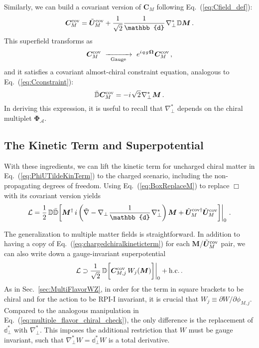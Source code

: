 \documentclass[12pt,document,nofootinbib,superscriptaddress,onecolumn,preprintnumbers,balancelastpage]{article}
\newcommand{\s}{\hspace{0.8pt}}
\newcommand{\PP}{\mathbb{d}}
\newcommand{\gauge}{\,\,\xrightarrow[\hspace{5pt}\text{Gauge}\hspace{5pt}]{}\,\,}
\DeclareRobustCommand{\Sec}[1]{Sec.~\ref{#1}}
\DeclareRobustCommand{\Eq}[1]{Eq.~(\ref{#1})}
\newcommand{\bM}{ \boldsymbol M}
\newcommand{\bPhiA}{ \boldsymbol{\Phi}_\alc}
\newcommand{\bC}{ \boldsymbol C}
\newcommand{\bU}{ \tilde{\boldsymbol U}}
\newcommand{\D}{\mathbb{D}}
\newcommand{\RCA}{\boldsymbol{\Omega}}
\newcommand{\alc}{\mathcal{A}}
\begin{document}
\begin{spacing}{1.2}
Similarly, we can build a covariant version of $\bC_M$ following \Eq{eq:Cfield_def}: 
%
\begin{equation}
\label{eq:CcovDefinition}
\bC^{\rm cov}_M = \bU^{\rm cov}_M  + \frac{1}{\sqrt{2}} \frac{1}{\PP}\s \nabla_\perp^*\s \D \bM \,.
\end{equation}
%
This superfield transforms as
%
\begin{equation}
\bC^{\rm cov}_M \gauge e^{i\s q\s g\s \RCA}\s \bC^{\rm cov}_M\,,
\label{eq:CcovGaugeTrans}
\end{equation}
%
and it satisfies a covariant almost-chiral constraint equation, analogous to \Eq{eq:Cconstraint}:
%
\begin{equation}
\bar{\D} \bC^{\rm cov}_M = -i \s \sqrt{2}\s \nabla_\perp^*\s \bM\,.
\label{eq:CcovConstraint}
\end{equation}
%
In deriving this expression, it is useful to recall that $\nabla_\perp^*$ depends on the chiral multiplet $\bPhiA$.



\subsection{The Kinetic Term and Superpotential}
\label{subsec:kinetictermchiralcharged}


With these ingredients, we can lift the kinetic term for uncharged chiral matter in \Eq{eq:PhiUTildeKinTerm} to the charged scenario,  including the non-propagating degrees of freedom.
%
Using \Eq{eq:BoxReplaceM} to replace $\Box$ with its covariant version yields
%
\begin{equation}
\label{eq:chargedchiralkineticterm}
\mathcal{L} = \frac{1}{2}\, \D \bar{\D} \bigg[ \bM^\dagger\, i \left(\tilde{\nabla} - \nabla_\perp\s \frac{1}{\PP}\s \nabla_\perp^* \right)  \bM + \bU_M^{\rm cov \dagger} \bU_M^{\rm cov} \bigg] \bigg|_{0} \,\,.
\end{equation}


The generalization to multiple matter fields is straightforward.
%
In addition to having a copy of \Eq{eq:chargedchiralkineticterm} for each $\bM$/$\bU_M^{\rm cov}$ pair, we can also write down a gauge-invariant superpotential
%
\begin{equation}
\label{eq:charged_superpotential}
\mathcal{L}\supset  \frac{1}{\sqrt{2}} \, \D \bigg[ \bC_{M,j}^{\rm cov} \,W_j(\bM) \bigg] \bigg|_{0} + \text{h.c.}\,.
\end{equation}
%
As in \Sec{sec:MultiFlavorWZ}, in order for the term in square brackets to be chiral and for the action to be RPI-I invariant, it is crucial that $W_j \equiv \partial W / \partial \phi_{M,j}$.
%
Compared to the analogous manipulation in \Eq{eq:multiple_flavor_chiral_check}, the only difference is the replacement of  $\PP_\perp^*$ with $\nabla_\perp^*$.
%
This imposes the additional restriction that $W$ must be gauge invariant, such that $\nabla_\perp^* W  = \PP_\perp^* W$ is a total derivative.



\end{spacing}
\end{document}
